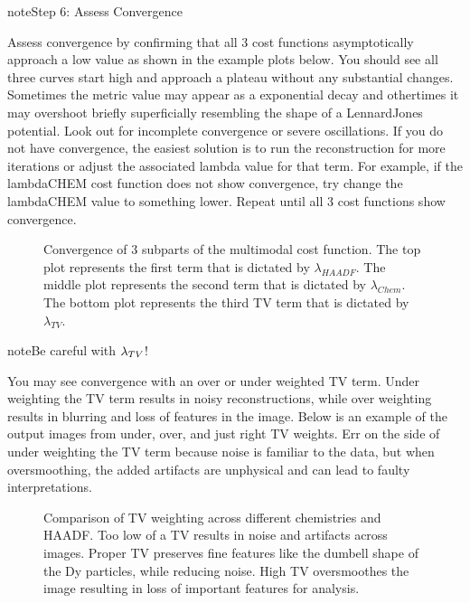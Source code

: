 \documentclass[letterpaper,10pt,english]{jupyterBook}
\let\sphinxpxdimen\pdfpxdimen\else\newdimen\sphinxpxdimen
\begin{document}
\begin{sphinxadmonition}{note}{Step 6: Assess Convergence}

\sphinxAtStartPar
Assess convergence by confirming that all 3 cost functions asymptotically approach a low value as shown in the example plots below.   You should see all three curves start high and approach a plateau without any substantial changes. Sometimes the metric value may appear as a exponential decay and othertimes it may overshoot briefly superficially resembling the shape of a Lennard\sphinxhyphen{}Jones potential. Look out for incomplete convergence or severe oscillations. If you do not have convergence, the easiest solution is to run the reconstruction for more iterations or adjust the associated lambda value for that term.  For example, if the lambdaCHEM cost function does not show convergence, try change the lambdaCHEM value to something lower.  Repeat until all 3 cost functions show convergence.
\end{sphinxadmonition}

\begin{figure}[htbp]
\centering
\capstart

\noindent\sphinxincludegraphics[width=700\sphinxpxdimen]{{Figure_4_Convergence}.png}
\caption{Convergence of 3 subparts of the multi\sphinxhyphen{}modal cost function.  The top plot represents the first term that is dictated by \(\lambda_{HAADF}\).  The middle plot represents the second term that is dictated by \(\lambda_{Chem}\). The bottom plot represents the third TV term that is dictated by \(\lambda_{TV}\).}\label{\detokenize{03_multi_modal:convergence}}\end{figure}

\begin{sphinxadmonition}{note}{Be careful with \protect\(\lambda_{TV}\protect\)!}

\sphinxAtStartPar
You may see convergence with an over or under weighted TV term.  Under weighting the TV term results in noisy reconstructions, while over weighting results in blurring and loss of features in the image.  Below is an example of the output images from under, over, and just right TV weights. Err on the side of under weighting the TV term  because noise is familiar to the data, but when oversmoothing, the added artifacts are unphysical and can lead to faulty interpretations.
\end{sphinxadmonition}

\begin{figure}[htbp]
\centering
\capstart

\noindent\sphinxincludegraphics[width=700\sphinxpxdimen]{{Figure_5_TV}.png}
\caption{Comparison of TV weighting across different chemistries and HAADF. Too low of a TV results in noise and artifacts across images.  Proper TV preserves fine features like the dumbell shape of the Dy particles, while reducing noise.  High TV oversmoothes the image resulting in loss of important features for analysis.}\label{\detokenize{03_multi_modal:tv-weights}}\end{figure}
\end{document}
